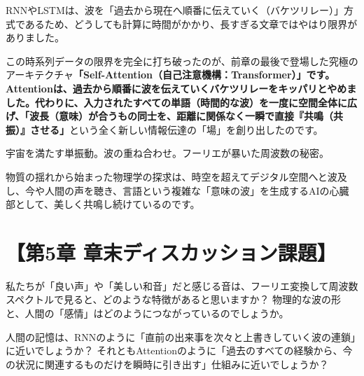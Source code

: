 RNNやLSTMは、波を「過去から現在へ順番に伝えていく（バケツリレー）」方式であるため、どうしても計算に時間がかかり、長すぎる文章ではやはり限界がありました。

この時系列データの限界を完全に打ち破ったのが、前章の最後で登場した究極のアーキテクチャ\textbf{「Self-Attention（自己注意機構：Transformer）」です。 Attentionは、過去から順番に波を伝えていくバケツリレーをキッパリとやめました。代わりに、入力されたすべての単語（時間的な波）を一度に空間全体に広げ、「波長（意味）が合うもの同士を、距離に関係なく一瞬で直接『共鳴（共振）』させる」}という全く新しい情報伝達の「場」を創り出したのです。

宇宙を満たす単振動。波の重ね合わせ。フーリエが暴いた周波数の秘密。

物質の揺れから始まった物理学の探求は、時空を超えてデジタル空間へと波及し、今や人間の声を聴き、言語という複雑な「意味の波」を生成するAIの心臓部として、美しく共鳴し続けているのです。

\section*{【第5章 章末ディスカッション課題】}

私たちが「良い声」や「美しい和音」だと感じる音は、フーリエ変換して周波数スペクトルで見ると、どのような特徴があると思いますか？ 物理的な波の形と、人間の「感情」はどのようにつながっているのでしょうか。

人間の記憶は、RNNのように「直前の出来事を次々と上書きしていく波の連鎖」に近いでしょうか？ それともAttentionのように「過去のすべての経験から、今の状況に関連するものだけを瞬時に引き出す」仕組みに近いでしょうか？




